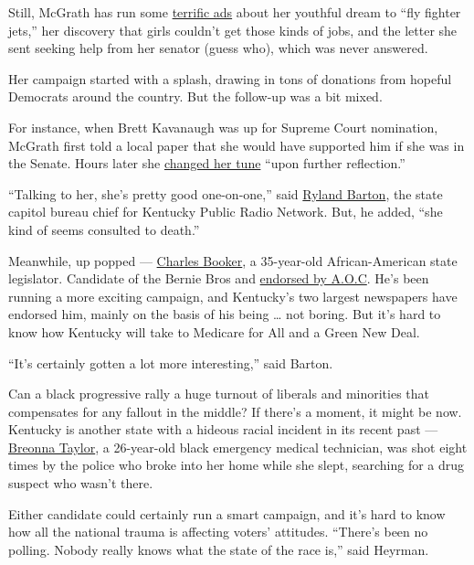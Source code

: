 Still, McGrath has run some
\href{https://www.youtube.com/watch?v=CcjG2fK7kNk}{terrific ads} about
her youthful dream to ``fly fighter jets,'' her discovery that girls
couldn't get those kinds of jobs, and the letter she sent seeking help
from her senator (guess who), which was never answered.

Her campaign started with a splash, drawing in tons of donations from
hopeful Democrats around the country. But the follow-up was a bit mixed.

For instance, when Brett Kavanaugh was up for Supreme Court nomination,
McGrath first told a local paper that she would have supported him if
she was in the Senate. Hours later she
\href{https://www.politico.com/story/2019/07/10/amy-mcgrath-brett-kavanaugh-1405832}{changed
her tune} ``upon further reflection.''

``Talking to her, she's pretty good one-on-one,'' said
\href{https://www.wkyufm.org/people/ryland-barton\#stream/0}{Ryland
Barton}, the state capitol bureau chief for Kentucky Public Radio
Network. But, he added, ``she kind of seems consulted to death.''

Meanwhile, up popped ---
\href{https://www.nytimes.com/2020/06/22/us/politics/charles-booker-amy-mcgrath-kentucky-adverstising.html}{Charles
Booker}, a 35-year-old African-American state legislator. Candidate of
the Bernie Bros and
\href{https://www.courier-journal.com/story/news/politics/elections/kentucky/2020/06/09/bernie-sanders-endorses-charles-booker-kentucky-senate-primary/5326417002/}{endorsed
by A.O.C}. He's been running a more exciting campaign, and Kentucky's
two largest newspapers have endorsed him, mainly on the basis of his
being \ldots{} not boring. But it's hard to know how Kentucky will take
to Medicare for All and a Green New Deal.

``It's certainly gotten a lot more interesting,'' said Barton.

Can a black progressive rally a huge turnout of liberals and minorities
that compensates for any fallout in the middle? If there's a moment, it
might be now. Kentucky is another state with a hideous racial incident
in its recent past ---
\href{https://www.nytimes.com/article/breonna-taylor-police.html}{Breonna
Taylor}, a 26-year-old black emergency medical technician, was shot
eight times by the police who broke into her home while she slept,
searching for a drug suspect who wasn't there.

Either candidate could certainly run a smart campaign, and it's hard to
know how all the national trauma is affecting voters' attitudes.
``There's been no polling. Nobody really knows what the state of the
race is,'' said Heyrman.


